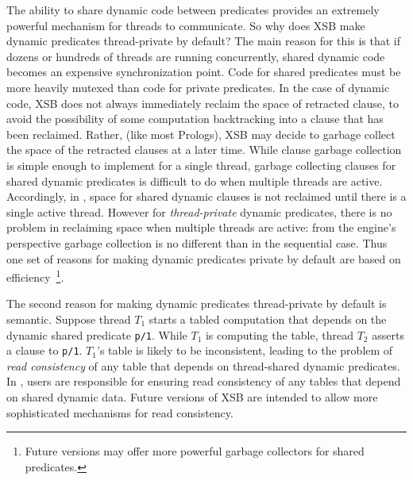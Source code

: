 The ability to share dynamic code between predicates provides an
extremely powerful mechanism for threads to communicate.  So why does
XSB make dynamic predicates thread-private by default?  The main
reason for this is that if dozens or hundreds of threads are running
concurrently, shared dynamic code becomes an expensive synchronization
point.  Code for shared predicates must be more heavily mutexed than
code for private predicates.  In the case of dynamic code, XSB does
not always immediately reclaim the space of retracted clause, to avoid
the possibility of some computation backtracking into a clause that
has been reclaimed.  Rather, (like most Prologs), XSB may decide to
garbage collect the space of the retracted clauses at a later time.
While clause garbage collection is simple enough to implement for a
single thread, garbage collecting clauses for shared dynamic
predicates is difficult to do when multiple threads are active.
Accordingly, in \version , space for shared dynamic clauses is not
reclaimed until there is a single active thread.  However for {\em
  thread-private} dynamic predicates, there is no problem in
reclaiming space when multiple threads are active: from the engine's
perspective garbage collection is no different than in the sequential
case.  Thus one set of reasons for making dynamic predicates private
by default are based on efficiency~\footnote{Future versions may offer
  more powerful garbage collectors for shared predicates.}.

The second reason for making dynamic predicates thread-private by
default is semantic.  Suppose thread $T_1$ starts a tabled computation
that depends on the dynamic shared predicate {\tt p/1}.  While $T_1$
is computing the table, thread $T_2$ asserts a clause to {\tt p/1}.
$T_1$'s table is likely to be inconsistent, leading to the problem of
{\em read consistency} of any table that depends on thread-shared
dynamic predicates.  In \version , users are responsible for ensuring
read consistency of any tables that depend on shared dynamic data.
Future versions of XSB are intended to allow more sophisticated
mechanisms for read consistency.

